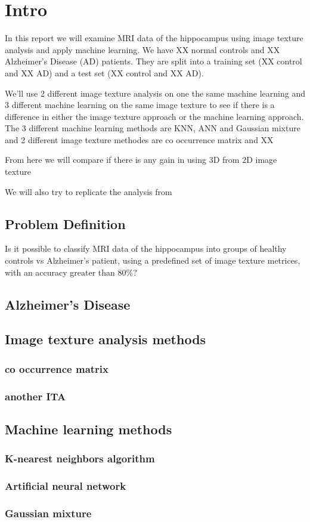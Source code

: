 \chapter{Intro}

In this report we will examine MRI data of the hippocampus using image texture analysis and apply machine learning. We have XX normal controls and XX Alzheimer's Disease (AD) patients. They are split into a training set (XX control and XX AD) and a test set (XX control and XX AD).

We'll use 2 different image texture analysis on one the same machine learning and 3 different machine learning on the same image texture to see if there is a difference in either the image texture approach or the machine learning approach. The 3 different machine learning methods are KNN, ANN and Gaussian mixture and 2 different image texture methodes are co occurrence matrix and XX

From here we will compare if there is any gain in using 3D from 2D image texture

We will also try to replicate the analysis from \cite{MRfreeborough}

\section{Problem Definition}

Is it possible to classify MRI data of the hippocampus into groups of healthy controls vs Alzheimer's patient, using a predefined set of image texture metrices, with an accuracy greater than 80\%?

\section{Alzheimer's Disease}

\section{Image texture analysis methods}

\subsection{co occurrence matrix}

\subsection{another ITA}

\section{Machine learning methods}

\subsection{K-nearest neighbors algorithm}

\subsection{Artificial neural network}

\subsection{Gaussian mixture}


